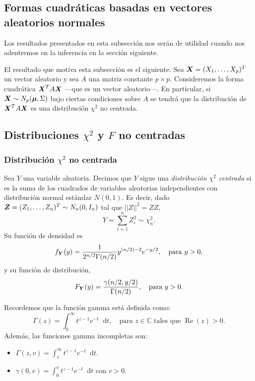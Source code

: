 \subsection{Formas cuadráticas basadas en vectores aleatorios normales}

Los resultados presentados en esta subsección nos serán de utilidad cuando nos adentremos en la inferencia en la sección siguiente.

El resultado que motiva esta subsección es el siguiente. Sea $\boldsymbol{X} = (X_1, \dots, X_p)^T$ un vector aleatorio y sea $A$ una matriz constante $p \times p$. Consideremos la forma cuadrática $\boldsymbol{X}^T A \boldsymbol{X}$ —que es un vector aleatorio—. En particular, si $\boldsymbol{X} \sim N_p(\boldsymbol \mu, \Sigma)$ bajo ciertas condiciones sobre $A$ se tendrá que la distribución de $\boldsymbol{X}^TA\boldsymbol{X}$ es una distribución $\chi^2$ no centrada.


\subsection{Distribuciones $\chi^2$ y $F$ no centradas}
\subsubsection{Distribución $\chi^2$ no centrada}

\begin{ndef}
  Sea $Y$ una variable aleatoria. Decimos que $Y$ sigue una \textit{distribución $\chi^2$ centrada} si es la suma de los cuadrados de variables aleatorias independientes con distribución normal estándar $N(0,1)$. Es decir, dado $\boldsymbol{Z} = (Z_1, \dots, Z_n)^T \sim N_n(0,I_n)$ tal que $||Z||^2 = Z Z$,
  \[
    Y = \sum_{i = 1}^n Z_i^2 \sim \chi^2_n.
  \]
  Su función de densidad es
  \[
    f_{\boldsymbol{Y}}(y) = \frac{1}{2^{n/2} \Gamma(n/2)} y^{(n/2) - 2} e^{-y/2}, \quad \text{para }y > 0,
  \]
  y su función de distribución,
  \[
    F_{\boldsymbol{Y}}(y) = \frac{\gamma(n/2, y/2)}{\Gamma(n/2)}, \quad\text{para } y > 0.
  \]
\end{ndef}

Recordemos que la función gamma está definida como:
\[
  \Gamma(z) = \int_0^\infty t^{z-1} e^{-t} \mathop{}\!\mathrm{d}t, \quad \text{para } z \in \mathbb C \text{ tales que } \!\operatorname{Re}(z)>0.
\]
Además, las funciones gamma incompletas son:
\begin{itemize}
  \item $\Gamma(z,v) = \int_v ^\infty t^{z-1} e^{-t} \mathop{}\!\mathrm{d}t$.
  \item $\gamma(0,v) = \int_0^v t^{z-1} e^{-t} \mathop{}\!\mathrm{d}t$ con $v>0$.
\end{itemize} 

